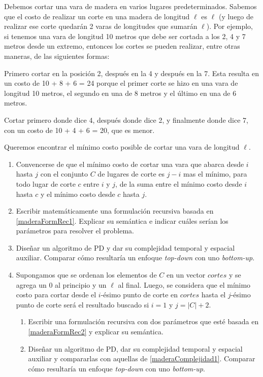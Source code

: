 

\item Debemos cortar una vara de madera en varios lugares predeterminados. Sabemos que el costo de realizar un corte en una madera de longitud $\ell$ es $\ell$ (y luego de realizar ese corte quedarán 2 varas de longitudes que sumarán $\ell$).  Por ejemplo, si tenemos una vara de longitud 10 metros que debe ser cortada a los 2, 4 y 7 metros desde un extremo, entonces los cortes se pueden realizar, entre otras maneras, de las siguientes formas:
\item Primero cortar en la posición 2, después en la 4 y después en la 7. Esta resulta en un costo de 10 + 8 + 6 = 24 porque el primer corte se hizo en una vara de longitud 10 metros, el segundo en una de 8 metros y el último en una de 6 metros.
\item Cortar primero donde dice 4, después donde dice 2, y finalmente donde dice 7, con un costo de 10 + 4 + 6 = 20, que es menor.
\par{Queremos encontrar el mínimo costo posible de cortar una vara de longitud $\ell$.}
\begin{enumerate}[label=$\alph*)$,ref=$\alph*)$]
\item Convencerse de que el mínimo costo de cortar una vara que abarca desde $i$ hasta $j$ con el conjunto $C$ de lugares de corte es $j-i$ mas el mínimo, para todo lugar de corte $c$ entre $i$ y $j$, de la suma entre el mínimo costo desde $i$ hasta $c$ y el mínimo costo desde $c$ hasta $j$.
\label{maderaFormRec1}
\item Escribir matemáticamente una formulación recursiva basada en \ref{maderaFormRec1}. Explicar su semántica e indicar cuáles serían los parámetros para resolver el problema.
\item Diseñar un algoritmo de PD y dar su complejidad temporal y espacial auxiliar. Comparar cómo resultaría un enfoque \textit{top-down} con uno \textit{bottom-up}.
\label{maderaComplejidad1}
\item Supongamos que se ordenan los elementos de $C$ en un vector $cortes$ y se agrega un $0$ al principio y un $\ell$ al final. Luego, se considera que el mínimo costo para cortar desde el $i$-ésimo punto de corte en $cortes$ hasta el $j$-ésimo punto de corte será el resultado buscado si $i = 1$ y $j = |C| + 2$.
\label{maderaFormRec2}
\begin{enumerate}[label=$\roman*)$,ref=$\roman*)$]
\item Escribir una formulación recursiva con dos parámetros que esté basada en \ref{maderaFormRec2} y explicar su semántica.
\item Diseñar un algoritmo de PD, dar su complejidad temporal y espacial auxiliar y compararlas con aquellas de \ref{maderaComplejidad1}. Comparar cómo resultaría un enfoque \textit{top-down} con uno \textit{bottom-up}.
\end{enumerate}
\end{enumerate}


